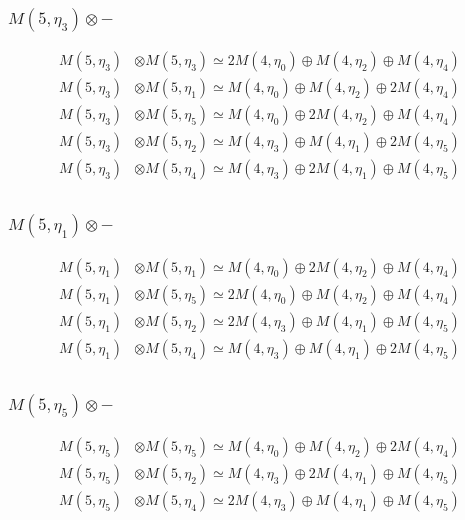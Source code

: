 \subsubsection{$ M(5,\eta_{3})\otimes -$}
\begin{align*}
M(5,\eta_{3}) &\otimes M(5,\eta_{3}) \simeq 2 M(4,\eta_{0}) \oplus M(4,\eta_{2}) \oplus M(4,\eta_{4})\\
M(5,\eta_{3}) &\otimes M(5,\eta_{1}) \simeq M(4,\eta_{0}) \oplus M(4,\eta_{2}) \oplus 2 M(4,\eta_{4})\\
M(5,\eta_{3}) &\otimes M(5,\eta_{5}) \simeq M(4,\eta_{0}) \oplus 2 M(4,\eta_{2}) \oplus M(4,\eta_{4})\\
M(5,\eta_{3}) &\otimes M(5,\eta_{2}) \simeq M(4,\eta_{3}) \oplus M(4,\eta_{1}) \oplus 2 M(4,\eta_{5})\\
M(5,\eta_{3}) &\otimes M(5,\eta_{4}) \simeq M(4,\eta_{3}) \oplus 2 M(4,\eta_{1}) \oplus M(4,\eta_{5})\\
\end{align*}

\subsubsection{$ M(5,\eta_{1})\otimes -$}
\begin{align*}
M(5,\eta_{1}) &\otimes M(5,\eta_{1}) \simeq M(4,\eta_{0}) \oplus 2 M(4,\eta_{2}) \oplus M(4,\eta_{4})\\
M(5,\eta_{1}) &\otimes M(5,\eta_{5}) \simeq 2 M(4,\eta_{0}) \oplus M(4,\eta_{2}) \oplus M(4,\eta_{4})\\
M(5,\eta_{1}) &\otimes M(5,\eta_{2}) \simeq 2 M(4,\eta_{3}) \oplus M(4,\eta_{1}) \oplus M(4,\eta_{5})\\
M(5,\eta_{1}) &\otimes M(5,\eta_{4}) \simeq M(4,\eta_{3}) \oplus M(4,\eta_{1}) \oplus 2 M(4,\eta_{5})\\
\end{align*}

\subsubsection{$ M(5,\eta_{5})\otimes -$}
\begin{align*}
M(5,\eta_{5}) &\otimes M(5,\eta_{5}) \simeq M(4,\eta_{0}) \oplus M(4,\eta_{2}) \oplus 2 M(4,\eta_{4})\\
M(5,\eta_{5}) &\otimes M(5,\eta_{2}) \simeq M(4,\eta_{3}) \oplus 2 M(4,\eta_{1}) \oplus M(4,\eta_{5})\\
M(5,\eta_{5}) &\otimes M(5,\eta_{4}) \simeq 2 M(4,\eta_{3}) \oplus M(4,\eta_{1}) \oplus M(4,\eta_{5})\\
\end{align*}

